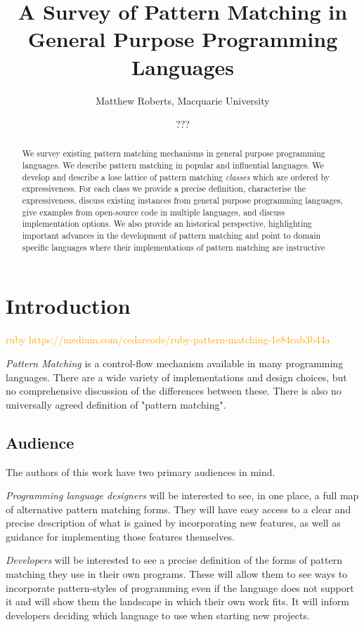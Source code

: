 \documentclass[acmsmall]{acmart}
\title{A Survey of Pattern Matching in General Purpose Programming Languages}
\author{Matthew Roberts, Macquarie University }
\author{??? }
\renewcommand\todo[1]{\textcolor{orange}{#1}}
\begin{document}
\begin{abstract}
We survey existing pattern matching mechanisms in general purpose programming languages.  We describe pattern matching in popular and influential languages.  We develop and describe a lose lattice of pattern matching \emph{classes} which are ordered by expressiveness.  For each class we provide a precise definition, characterise the expressiveness, discuss existing instances from general purpose programming languages, give examples from open-source code in multiple languages, and discuss implementation options.  We also provide an historical perspective, highlighting important advances in the development of pattern matching and point to domain specific languages where their implementations of pattern matching are instructive
\end{abstract}

\maketitle

\section{Introduction}
\todo{ruby https://medium.com/cedarcode/ruby-pattern-matching-1e84cab3b44a}

\emph{Pattern Matching} is a control-flow mechanism available in many programming languages. There are a wide variety of implementations and design choices, but no comprehensive discussion of the differences between these.  There is also no universally agreed definition of "pattern matching". 

\subsection{Audience}
The authors of this work have two primary audiences in mind.  

\emph{Programming language designers} will be interested to see, in one place, a full map of alternative pattern matching forms.  They will have easy access to a clear and precise description of what is gained by incorporating new features, as well as guidance for implementing those features themselves.  

\emph{Developers} will be interested to see a precise definition of the forms of pattern matching they use in their own programs.  These will allow them to see ways to incorporate pattern-styles of programming even if the language does not support it and will show them the landscape in which their own work fits.  It will inform developers deciding which language to use when starting new projects.  
\end{document}
